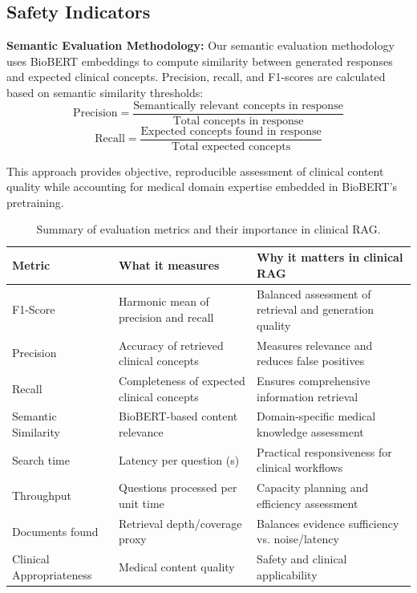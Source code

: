 \subsection{Safety Indicators}

\textbf{Semantic Evaluation Methodology:}
Our semantic evaluation methodology uses BioBERT embeddings to compute similarity between generated responses and expected clinical concepts. Precision, recall, and F1-scores are calculated based on semantic similarity thresholds:
\begin{equation}
\text{Precision} = \frac{\text{Semantically relevant concepts in response}}{\text{Total concepts in response}}
\end{equation}
\begin{equation}
\text{Recall} = \frac{\text{Expected concepts found in response}}{\text{Total expected concepts}}
\end{equation}

This approach provides objective, reproducible assessment of clinical content quality while accounting for medical domain expertise embedded in BioBERT's pretraining.

\begin{table}[H]
\centering
{\footnotesize
\renewcommand\arraystretch{0.95}
\begin{tabularx}{\textwidth}{l X X}
  \toprule
  Metric & What it measures & Why it matters in clinical RAG \\
  \midrule
  F1-Score & Harmonic mean of precision and recall & Balanced assessment of retrieval and generation quality \\[3em]
  Precision & Accuracy of retrieved clinical concepts & Measures relevance and reduces false positives \\[2em]
  Recall & Completeness of expected clinical concepts & Ensures comprehensive information retrieval \\[2em]
  Semantic Similarity & BioBERT-based content relevance & Domain-specific medical knowledge assessment \\[2em]
  Search time & Latency per question (s) & Practical responsiveness for clinical workflows \\[2em]
  Throughput & Questions processed per unit time & Capacity planning and efficiency assessment \\[2em]
  Documents found & Retrieval depth/coverage proxy & Balances evidence sufficiency vs. noise/latency \\[2em]
  Clinical Appropriateness & Medical content quality & Safety and clinical applicability \\[4pt]
  \bottomrule
\end{tabularx}
}
\caption{Summary of evaluation metrics and their importance in clinical RAG.}
\label{tab:metrics_summary}
\end{table}

